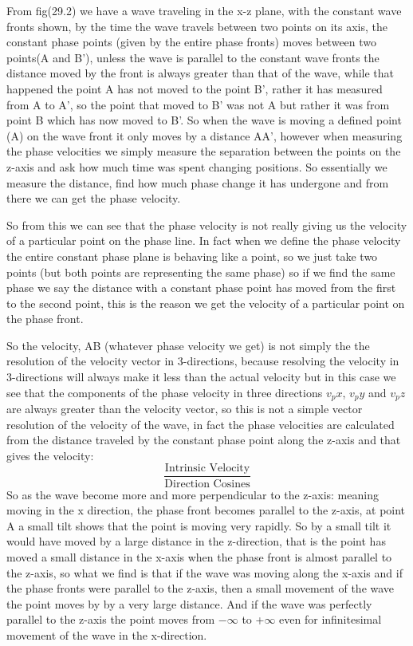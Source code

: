From fig(29.2) we have a wave traveling in the x-z plane, with the constant wave fronts shown, by the time the wave travels between two points on its axis, the constant phase points (given by the entire phase fronts) moves between two points(A and B'), unless the wave is parallel to the constant wave fronts the distance moved by the front is always greater than that of the wave, while that happened the point A has not moved to the point B', rather it has measured from A to A', so the point that moved to B' was not A but rather it was from point B which has now moved to B'. So when the wave is moving a defined point (A) on the wave front it only moves by a distance AA', however when measuring the phase velocities we simply measure the separation between the points on the z-axis and ask how much time was spent changing positions. So essentially we measure the distance, find how much phase change it has undergone and from there we can get the phase velocity.

So from this we can see that the phase velocity is not really giving us the velocity of a particular point on the phase line. In fact when we define the phase velocity the entire constant phase plane is behaving like a point, so we just take two points (but both points are representing the same phase) so if we find the same phase we say the distance with a constant phase point has moved from the first to the second point, this is the reason we get the velocity of a particular point on the phase front.

So the velocity, AB (whatever phase velocity we get) is not simply the the resolution of the velocity vector in 3-directions, because resolving the velocity in 3-directions will always make it less than the actual velocity but in this case we see that the components of the phase velocity in three directions $v_px$, $v_py$ and $v_pz$ are always greater than the velocity vector, so this is not a simple vector resolution of the velocity of the wave, in fact the phase velocities are calculated from the distance traveled by the constant phase point along the z-axis and that gives the velocity:
\begin{dmath*}
\frac{\text{Intrinsic Velocity}}{\text{Direction Cosines}}
\end{dmath*}
So as the wave become more and more perpendicular to the z-axis: meaning moving in the x direction, the phase front becomes parallel to the z-axis, at point A a small tilt shows that the point is moving very rapidly. So by a small tilt it would have moved by a large distance in the z-direction, that is the point has moved a small distance in the x-axis when the phase front is almost parallel to the z-axis, so what we find is that if the wave was moving along the x-axis and if the phase fronts were parallel to the z-axis, then a small movement of the wave the point moves by by a very large distance. And if the wave was perfectly parallel to the z-axis the point moves from $-\infty$ to +$\infty$ even for infinitesimal movement of the wave in the x-direction.

